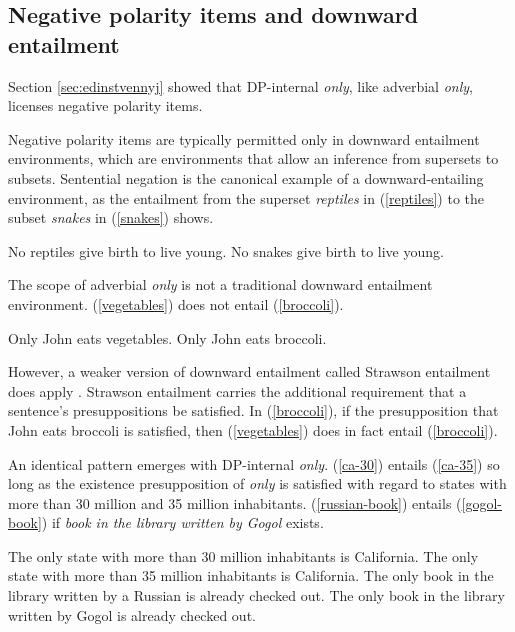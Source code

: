 \subsection{Negative polarity items and downward entailment}
Section \ref{sec:edinstvennyj} showed that DP-internal \textit{only}, like adverbial \textit{only}, licenses negative polarity items.

Negative polarity items are typically permitted only in downward entailment environments, which are environments that allow an inference from supersets to subsets. Sentential negation is the canonical example of a downward-entailing environment, as the entailment from the superset \textit{reptiles} in (\ref{reptiles}) to the subset \textit{snakes} in (\ref{snakes}) shows.

\begin{exe}
	\ex \label{reptiles} No reptiles give birth to live young.
	\ex \label{snakes} No snakes give birth to live young.
\end{exe}

The scope of adverbial \textit{only} is not a traditional downward entailment environment. (\ref{vegetables}) does not entail (\ref{broccoli}).

\begin{exe}
	\ex \label{vegetables} Only John eats vegetables.
	\ex \label{broccoli} Only John eats broccoli.
\end{exe}

However, a weaker version of downward entailment called Strawson entailment does apply \citep{fintel99}. Strawson entailment carries the additional requirement that a sentence's presuppositions be satisfied. In (\ref{broccoli}), if the presupposition that John eats broccoli is satisfied, then (\ref{vegetables}) does in fact entail (\ref{broccoli}).

An identical pattern emerges with DP-internal \textit{only}. (\ref{ca-30}) entails (\ref{ca-35}) so long as the existence presupposition of \textit{only} is satisfied with regard to states with more than 30 million and 35 million inhabitants. (\ref{russian-book}) entails (\ref{gogol-book}) if \textit{book in the library written by Gogol} exists.

\begin{exe}
	\ex \label{ca-30} The only state with more than 30 million inhabitants is California.
	\ex \label{ca-35} The only state with more than 35 million inhabitants is California.
	\ex \label{russian-book} The only book in the library written by a Russian is already checked out.
	\ex \label{gogol-book} The only book in the library written by Gogol is already checked out.
\end{exe}

